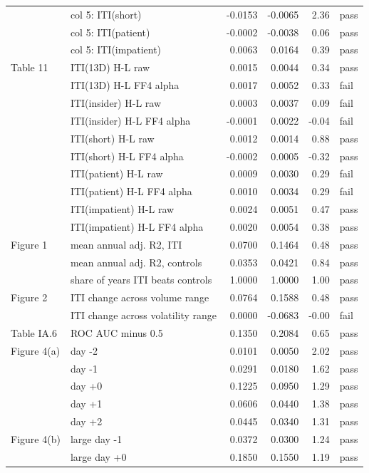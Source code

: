 \begin{longtable}{llrrrl}
 & col 5: ITI(short) & -0.0153 & -0.0065 & 2.36 & pass \\
 & col 5: ITI(patient) & -0.0002 & -0.0038 & 0.06 & pass \\
 & col 5: ITI(impatient) & 0.0063 & 0.0164 & 0.39 & pass \\
\midrule
Table 11 & ITI(13D) H-L raw & 0.0015 & 0.0044 & 0.34 & pass \\
 & ITI(13D) H-L FF4 alpha & 0.0017 & 0.0052 & 0.33 & fail \\
 & ITI(insider) H-L raw & 0.0003 & 0.0037 & 0.09 & fail \\
 & ITI(insider) H-L FF4 alpha & -0.0001 & 0.0022 & -0.04 & fail \\
 & ITI(short) H-L raw & 0.0012 & 0.0014 & 0.88 & pass \\
 & ITI(short) H-L FF4 alpha & -0.0002 & 0.0005 & -0.32 & pass \\
 & ITI(patient) H-L raw & 0.0009 & 0.0030 & 0.29 & fail \\
 & ITI(patient) H-L FF4 alpha & 0.0010 & 0.0034 & 0.29 & fail \\
 & ITI(impatient) H-L raw & 0.0024 & 0.0051 & 0.47 & pass \\
 & ITI(impatient) H-L FF4 alpha & 0.0020 & 0.0054 & 0.38 & pass \\
\midrule
Figure 1 & mean annual adj. R2, ITI & 0.0700 & 0.1464 & 0.48 & pass \\
 & mean annual adj. R2, controls & 0.0353 & 0.0421 & 0.84 & pass \\
 & share of years ITI beats controls & 1.0000 & 1.0000 & 1.00 & pass \\
\midrule
Figure 2 & ITI change across volume range & 0.0764 & 0.1588 & 0.48 & pass \\
 & ITI change across volatility range & 0.0000 & -0.0683 & -0.00 & fail \\
\midrule
Table IA.6 & ROC AUC minus 0.5 & 0.1350 & 0.2084 & 0.65 & pass \\
\midrule
Figure 4(a) & day -2 & 0.0101 & 0.0050 & 2.02 & pass \\
 & day -1 & 0.0291 & 0.0180 & 1.62 & pass \\
 & day +0 & 0.1225 & 0.0950 & 1.29 & pass \\
 & day +1 & 0.0606 & 0.0440 & 1.38 & pass \\
 & day +2 & 0.0445 & 0.0340 & 1.31 & pass \\
\midrule
Figure 4(b) & large day -1 & 0.0372 & 0.0300 & 1.24 & pass \\
 & large day +0 & 0.1850 & 0.1550 & 1.19 & pass \\

\end{longtable}
